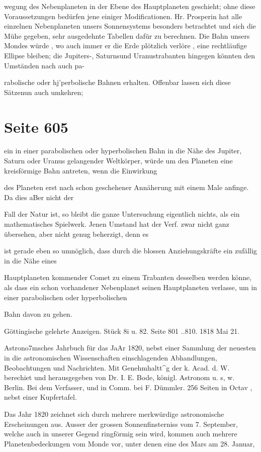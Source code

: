 \documentclass[10pt,a4paper]{article}
\begin{document}
wegung des Nebenplaneten in der Ebene des Hauptplaneten geschieht; ohne diese Voraussetzungen bedürfen jene einiger Modificationen. Hr. Prosperin hat alle einzelnen Nebenplaneten unsers Sonnensystems besonders betrachtet und sich die Mühe gegeben, sehr ausgedehnte Tabellen dafür zu berechnen. Die Bahn unsers Mondes würde , wo auch immer er die Erde plötzlich verlöre , eine rechtläufige Ellipse bleiben; die Jupiters-, Saturnsund Uranustrabanten hingegen könnten den Umständen nach auch pa-

rabolische oder hj'perbolische Bahnen erhalten. Offenbar lassen sich diese Sätzenun auch umkehren;


\newpage
\section*{Seite 605}
ein in einer parabolischen oder hyperbolischen Bahn in die Nähe des Jupiter, Saturn oder Uranus gelangender Weltkörper, würde um den Planeten eine kreisförmige Bahn antreten, wenn die Einwirkung

des Planeten erst nach schon geschehener Annäherung mit einem Male anfinge. Da dies aBer nicht der

Fall der Natur ist, so bleibt die ganze Untersuchung eigentlich nichts, als ein mathematisches Spielwerk. Jenen Umstand hat der Verf. zwar nicht ganz übersehen, aber nicht genug beherzigt, denn es

ist gerade eben so umnöglich, dass durch die blossen Anziehungskräfte ein zufällig in die Nähe eines

Hauptplaneten kommender Comet zu einem Trabanten desselben werden könne, als dass ein schon vorhandener Nebenplanet seinen Hauptplaneten verlasse, um in einer parabolischen oder hyperbolischen

Bahn davon zu gehen.

Göttingische gelehrte Anzeigen. Stück 8i u. 82. Seite 801 ..810. 1818 Mai 21.

Astrono7msches Jahrbuch für das JaAr 1820, nebst einer Sammlung der neuesten in die astronomischen Wissenschaften einschlagenden Abhandlungen, Beobachtungen und Nachrichten. Mit Genehmhaltt\textasciicircum{}g der k. Acad. d. W. berechiet und herausgegeben von Dr. I. E. Bode, königl. Astronom u. s, w. Berlin. Bei dem Verfasser, und in Comm. bei F. Dümmler. 256 Seiten in Octav , nebst einer Kupfertafel.

Das Jahr 1820 zeichnet sich durch mehrere merkwürdige astronomische Erscheinungen aus. Ausser der grossen Sonnenfinsterniss vom 7. September, welche auch in unserer Gegend ringförmig sein wird, kommen auch mehrere Planetenbedeckungen vom Monde vor, unter denen eine des Mars am 28. Januar,
\end{document}
